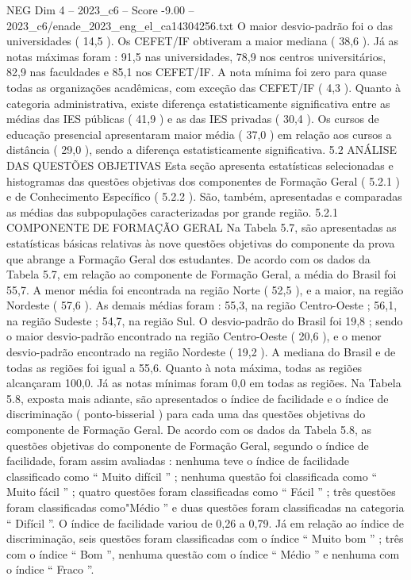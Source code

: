 \begin{textsample}{NEG Dim 4 – 2023\_c6 – Score -9.00 – 2023\_c6/enade\_2023\_eng\_el\_ca14304256.txt}
O maior desvio-padrão foi o das universidades ( 14,5 ).
Os CEFET/IF obtiveram a maior mediana ( 38,6 ).
Já as notas máximas foram : 91,5 nas universidades, 78,9 nos centros universitários, 82,9 nas faculdades e 85,1 nos CEFET/IF.
A nota mínima foi zero para quase todas as organizações acadêmicas, com exceção das CEFET/IF ( 4,3 ).
Quanto à categoria administrativa, existe diferença estatisticamente significativa entre as médias das IES públicas ( 41,9 ) e as das IES privadas ( 30,4 ).
Os cursos de educação presencial apresentaram maior média ( 37,0 ) em relação aos cursos a distância ( 29,0 ), sendo a diferença estatisticamente significativa. 5.2 ANÁLISE DAS QUESTÕES OBJETIVAS Esta seção apresenta estatísticas selecionadas e histogramas das questões objetivas dos componentes de Formação Geral ( 5.2.1 ) e de Conhecimento Específico ( 5.2.2 ).
São, também, apresentadas e comparadas as médias das subpopulações caracterizadas por grande região. 5.2.1 COMPONENTE DE FORMAÇÃO GERAL Na Tabela 5.7, são apresentadas as estatísticas básicas relativas às nove questões objetivas do componente da prova que abrange a Formação Geral dos estudantes.
De acordo com os dados da Tabela 5.7, em relação ao componente de Formação Geral, a média do Brasil foi 55,7.
A menor média foi encontrada na região Norte ( 52,5 ), e a maior, na região Nordeste ( 57,6 ).
As demais médias foram : 55,3, na região Centro-Oeste ; 56,1, na região Sudeste ; 54,7, na região Sul.
O desvio-padrão do Brasil foi 19,8 ; sendo o maior desvio-padrão encontrado na região Centro-Oeste ( 20,6 ), e o menor desvio-padrão encontrado na região Nordeste ( 19,2 ).
A mediana do Brasil e de todas as regiões foi igual a 55,6.
Quanto à nota máxima, todas as regiões alcançaram 100,0.
Já as notas mínimas foram 0,0 em todas as regiões.
Na Tabela 5.8, exposta mais adiante, são apresentados o índice de facilidade e o índice de discriminação ( ponto-bisserial ) para cada uma das questões objetivas do componente de Formação Geral.
De acordo com os dados da Tabela 5.8, as questões objetivas do componente de Formação Geral, segundo o índice de facilidade, foram assim avaliadas : nenhuma teve o índice de facilidade classificado como “ Muito difícil ” ; nenhuma questão foi classificada como “ Muito fácil ” ; quatro questões foram classificadas como “ Fácil ” ; três questões foram classificadas como"Médio ” e duas questões foram classificadas na categoria “ Difícil ”.
O índice de facilidade variou de 0,26 a 0,79.
Já em relação ao índice de discriminação, seis questões foram classificadas com o índice “ Muito bom ” ; três com o índice “ Bom ”, nenhuma questão com o índice “ Médio ” e nenhuma com o índice “ Fraco ”.

\end{textsample}
